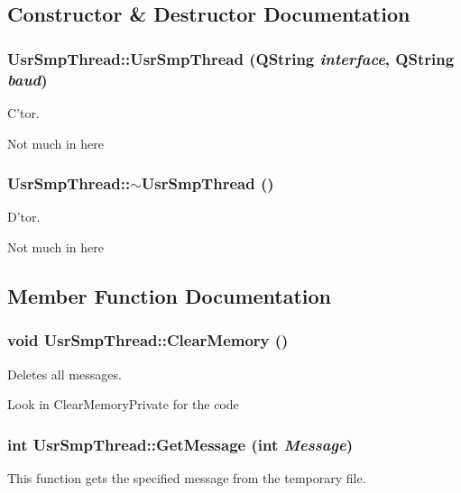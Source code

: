 \subsection{Constructor \& Destructor Documentation}
\subsubsection{\setlength{\rightskip}{0pt plus 5cm}Usr\-Smp\-Thread::Usr\-Smp\-Thread (QString {\em interface}, QString {\em baud})}\label{classUsrSmpThread_a0}


C'tor. 

Not much in here 
\subsubsection{\setlength{\rightskip}{0pt plus 5cm}Usr\-Smp\-Thread::$\sim${\bf Usr\-Smp\-Thread} ()}\label{classUsrSmpThread_a1}


D'tor. 

Not much in here 

\subsection{Member Function Documentation}
\subsubsection{\setlength{\rightskip}{0pt plus 5cm}void Usr\-Smp\-Thread::Clear\-Memory ()}\label{classUsrSmpThread_a7}


Deletes all messages. 

Look in Clear\-Memory\-Private for the code 
\subsubsection{\setlength{\rightskip}{0pt plus 5cm}int Usr\-Smp\-Thread::Get\-Message (int {\em Message})}\label{classUsrSmpThread_a13}


This function gets the specified message from the temporary file. 

